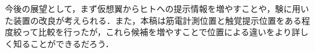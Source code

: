 \begin{small}
    今後の展望として，まず仮想翼からヒトへの提示情報を増やすことや，験に用いた装置の改良が考えられる．また，本稿は筋電計測位置と触覚提示位置をある程度絞って比較を行ったが，これら候補を増やすことで位置による違いをより詳しく知ることができるだろう．
  


{
\scriptsize %


}

\end{small}

